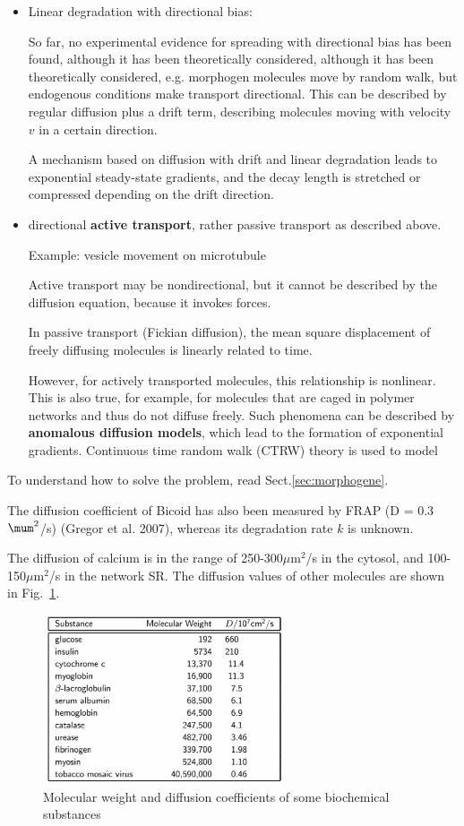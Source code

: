 \begin{itemize}
  \item Linear degradation with directional bias:
  
  So far, no experimental evidence for spreading with directional bias has been
found, although it has been theoretically considered, although it has been
theoretically considered, e.g. morphogen molecules move by random walk, but
endogenous conditions make transport directional. This can be described by
regular diffusion plus a drift term, describing molecules moving with velocity
$v$ in a certain direction. 

A mechanism based on diffusion with drift and linear degradation leads to
exponential steady-state gradients, and the decay length is stretched or
compressed depending on the drift direction.

  
  \item directional {\bf active transport}, rather passive transport as
  described above.
  
  Example: vesicle movement on microtubule
  
  Active transport may be nondirectional, but it cannot be described by the
  diffusion equation, because it invokes forces.
  
  In passive transport (Fickian diffusion), the mean square displacement of
  freely diffusing molecules is linearly related to time.
  
  However, for actively transported molecules, this relationship is nonlinear.
  This is also true, for example, for molecules that are caged in polymer
  networks and thus do not diffuse freely.
  Such phenomena can be described by {\bf anomalous diffusion models}, which
  lead to the formation of exponential gradients.
   Continuous time random walk (CTRW) theory is used to model   \citep{hornung2005}
    
\end{itemize}
To understand how to solve the problem, read Sect.\ref{sec:morphogene}.

The diffusion coefficient of Bicoid has also been measured by FRAP (D = 0.3
$\mum^2$/s) (Gregor et al. 2007), whereas its degradation rate $k$ is unknown.

 The diffusion of calcium is in the range of 250-300$\mu$m$^2$/s in the
cytosol, and 100-150$\mu$m$^2$/s in the network SR. 
The diffusion values of other molecules are shown in Fig.~\ref{fig:diffusion_values}.

\begin{figure}[hbt]
 \centerline{\includegraphics[height=5cm, angle=0]{./images/diffusion_values.eps}}
\caption{Molecular weight and diffusion coefficients of some
  biochemical substances}
\label{fig:diffusion_values}
\end{figure}


